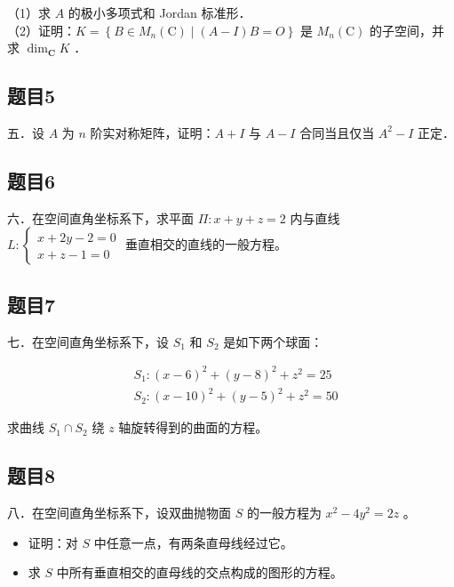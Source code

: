 \documentclass{article}
\begin{document}
（1）求 \(A\) 的极小多项式和 Jordan 标准形．\\
（2）证明：\(K=\left\{B \in M_{n}(\mathrm{C}) \mid(A-I) B=O\right\}\) 是 \(M_{n}(\mathrm{C})\) 的子空间，并求 \(\operatorname{dim}_{\mathbf{C}} K\) ．

\subsection{题目5}
五．设 \(A\) 为 \(n\) 阶实对称矩阵，证明：\(A+I\) 与 \(A-I\) 合同当且仅当 \(A^{2}-I\) 正定．

\subsection{题目6}
六．在空间直角坐标系下，求平面 \(\Pi: x+y+z=2\) 内与直线 \(L:\left\{\begin{array}{l}x+2 y-2=0 \\ x+z-1=0\end{array}\right.\) 垂直相交的直线的一般方程。

\subsection{题目7}
七．在空间直角坐标系下，设 \(S_{1}\) 和 \(S_{2}\) 是如下两个球面：

\[
\begin{aligned}
& S_{1}:(x-6)^{2}+(y-8)^{2}+z^{2}=25 \\
& S_{2}:(x-10)^{2}+(y-5)^{2}+z^{2}=50
\end{aligned}
\]

求曲线 \(S_{1} \cap S_{2}\) 绕 \(z\) 轴旋转得到的曲面的方程。

\subsection{题目8}
八．在空间直角坐标系下，设双曲抛物面 \(S\) 的一般方程为 \(x^{2}-4 y^{2}=2 z\) 。

\begin{itemize}
  \item[（1）] 证明：对 \(S\) 中任意一点，有两条直母线经过它。
  \item[（2）] 求 \(S\) 中所有垂直相交的直母线的交点构成的图形的方程。
\end{itemize}
\end{document}
